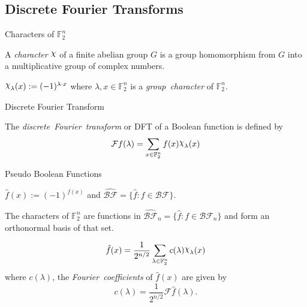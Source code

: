 \documentclass{beamer}
\def\gftwo{\mathbb{F}_2}
\def\BF{\mathcal{BF}}
\def\Chi{\raisebox{2pt}{$\chi$}}
\begin{document}
\subsection{Discrete Fourier Transforms}
\begin{frame}{Characters of $\gftwo^n$}
  \begin{definition}
    A {\em character} $\Chi$ of a finite abelian group $G$ is a group
    homomorphism from $G$ into a multiplicative group of complex numbers.
  \end{definition}
  \begin{fact}
    $\Chi_\lambda(x):=(-1)^{\lambda\cdot x}$ where $\lambda,x\in\gftwo^n$ is a
    {\em group\ character} of $\gftwo^n$.
  \end{fact}
\end{frame}

\begin{frame}{Discrete Fourier Transform}
  \begin{definition}\label{def:DFT}
    The {\em discrete\ Fourier\ transform} or DFT of a Boolean function is
    defined by
    \begin{equation}\label{eqn:DFT}
      \mathcal{F}f(\lambda)
        =\sum_{x\in\gftwo^n}f(x)\Chi_\lambda(x)
  	\end{equation}
  \end{definition}
\end{frame}

\begin{frame}{Pseudo Boolean Functions}
  \begin{definition}
    $\hat{f}(x):=(-1)^{f(x)}$ and $\hat{\BF}=\{\hat{f}:f\in\BF\}$.
  \end{definition}
  \begin{lemma}
    The characters of $\gftwo^n$ are functions in $\hat{\BF}_n
    =\{\hat{f}:f\in\BF_n\}$ and form an orthonormal basis of that set.
  \end{lemma}
\end{frame}

\begin{frame}
  \begin{lemma}
  \begin{equation}\label{eqn:rewrite-pseudo}
  	\hat{f}(x)
      =\frac{1}{2^{n/2}}
        \sum_{\lambda\in\gftwo^n}c(\lambda)\Chi_\lambda(x)
  \end{equation}
  	where $c(\lambda)$, the {\em Fourier\ coefficients} of $\hat{f}(x)$ are
    given by
    \begin{equation}\label{eqn:clambda}
      c(\lambda)=\frac{1}{2^{n/2}}\mathcal{F}\hat{f}(\lambda).
    \end{equation}
  \end{lemma}
\end{frame}
\end{document}
